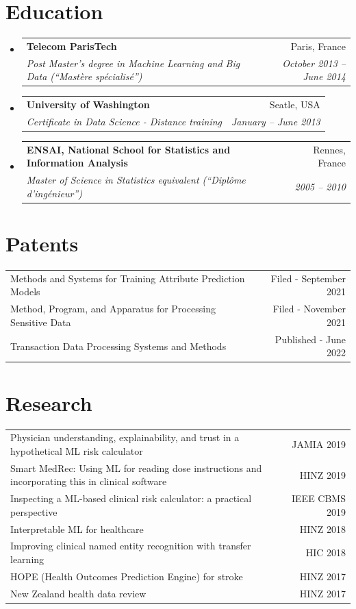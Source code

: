\documentclass[letterpaper,11pt]{article}
\makeatletter
\newcommand{\resumeSubheading}[4]{
  \vspace{-1pt}\item
    \begin{tabular*}{0.97\textwidth}[t]{l@{\extracolsep{\fill}}r}
      \textbf{#1} & #2 \\
      \textit{\small#3} & \textit{\small #4} \\
    \end{tabular*}\vspace{-5pt}
}
\newcommand{\resumeSubHeadingListStart}{\begin{itemize}[leftmargin=*]}
\newcommand{\resumeSubHeadingListEnd}{\end{itemize}}
\makeatother
\begin{document}
\section{Education}
  \resumeSubHeadingListStart
    \resumeSubheading
      {Telecom ParisTech}{Paris, France}
      {Post Master’s degree in Machine Learning and Big Data (“Mastère spécialisé”)}{October 2013 -- June 2014}
    \resumeSubheading
      {University of Washington}{Seatle, USA}
      {Certificate in Data Science - Distance training}{January -- June 2013}
    \resumeSubheading
      {ENSAI, National School for Statistics and Information Analysis}{Rennes, France}
      {Master of Science in Statistics equivalent (“Diplôme d’ingénieur”)}{2005 -- 2010}
  \resumeSubHeadingListEnd
  
\section{Patents}
\begin{tabular*}{\textwidth}{l@{\extracolsep{\fill}}r}
Methods and Systems for Training Attribute Prediction Models & Filed - September 2021\\
Method, Program, and Apparatus for Processing Sensitive Data & Filed - November 2021\\
Transaction Data Processing Systems and Methods & Published - June 2022\\
\end{tabular*}

\section{Research} 
\begin{tabular*}{\textwidth}{l@{\extracolsep{\fill}}r}
Physician understanding, explainability, and trust in a hypothetical ML risk calculator & JAMIA 2019\\
{\small Smart MedRec: Using ML for reading dose instructions and incorporating this in clinical software} & HINZ 2019\\
Inspecting a ML-based clinical risk calculator: a practical perspective & IEEE CBMS 2019\\
Interpretable ML for healthcare & HINZ 2018\\
Improving clinical named entity recognition with transfer learning &  HIC 2018\\
HOPE (Health Outcomes Prediction Engine) for stroke & HINZ 2017\\
New Zealand health data review & HINZ 2017\\
\end{tabular*}
\end{document}
